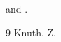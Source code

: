 \documentclass{article}
\begin{document}
\cite{k} and \citet{z}.
\begin{thebibliography}{9}
 Knuth.
 Z.
\end{thebibliography}
\end{document}
